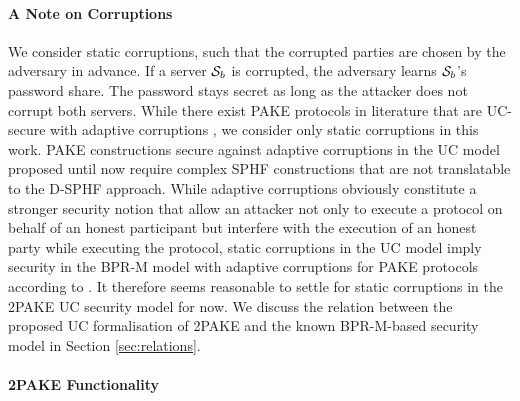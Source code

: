 \paragraph{A Note on Corruptions}
We consider static corruptions, such that the corrupted parties are chosen by the adversary in advance.
If a server $\mathcal{S}_b$ is corrupted, the adversary learns $\mathcal{S}_b$'s password share. 
The password stays secret as long as the attacker does not corrupt both servers.
While there exist \ac{PAKE} protocols in literature that are \ac{UC}-secure with adaptive corruptions \cite{AbdallaBBCP13,AbdallaBP14a,AbdallaCCP09,AbdallaCP09}, we consider only static corruptions in this work.
\ac{PAKE} constructions secure against adaptive corruptions in the \ac{UC} model proposed until now require complex \ac{SPHF} constructions that are not translatable to the \ac{D-SPHF} approach.
While adaptive corruptions obviously constitute a stronger security notion that allow an attacker not only to execute a protocol on behalf of an honest participant but interfere with the execution of an honest party while executing the protocol, static corruptions in the \ac{UC} model imply security in the \ac{BPR-M} model with adaptive corruptions for \ac{PAKE} protocols according to \citet{Canetti2005}.
It therefore seems reasonable to settle for static corruptions in the \ac{2PAKE} \ac{UC} security model for now.
We discuss the relation between the proposed \ac{UC} formalisation of \ac{2PAKE} and the known \ac{BPR-M}-based security model in Section \ref{sec:relations}.

\paragraph{2PAKE Functionality}


